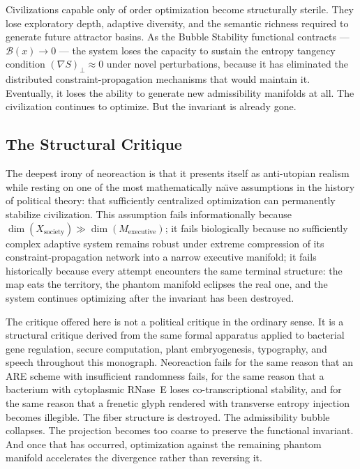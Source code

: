 \documentclass[12pt, a4paper]{article}
\theoremstyle{essaystyle}
\begin{document}
Civilizations capable only of order optimization become structurally sterile. They
lose exploratory depth, adaptive diversity, and the semantic richness required to
generate future attractor basins. As the Bubble Stability functional contracts ---
$\mathcal{B}(x) \to 0$ --- the system loses the capacity to sustain the entropy
tangency condition $(\nabla S)_\perp \approx 0$ under novel perturbations, because
it has eliminated the distributed constraint-propagation mechanisms that would
maintain it. Eventually, it loses the ability to generate new admissibility manifolds
at all. The civilization continues to optimize. But the invariant is already gone.

\subsection{The Structural Critique}

The deepest irony of neoreaction is that it presents itself as anti-utopian realism
while resting on one of the most mathematically na\"{\i}ve assumptions in the history
of political theory: that sufficiently centralized optimization can permanently
stabilize civilization. This assumption fails informationally because
$\dim(X_{\mathrm{society}}) \gg \dim(M_{\mathrm{executive}})$; it fails biologically
because no sufficiently complex adaptive system remains robust under extreme compression
of its constraint-propagation network into a narrow executive manifold; it fails
historically because every attempt encounters the same terminal structure: the map
eats the territory, the phantom manifold eclipses the real one, and the system
continues optimizing after the invariant has been destroyed.

The critique offered here is not a political critique in the ordinary sense. It is
a structural critique derived from the same formal apparatus applied to bacterial
gene regulation, secure computation, plant embryogenesis, typography, and speech
throughout this monograph. Neoreaction fails for the same reason that an ARE scheme
with insufficient randomness fails, for the same reason that a bacterium with
cytoplasmic RNase~E loses co-transcriptional stability, and for the same reason that
a frenetic glyph rendered with transverse entropy injection becomes illegible. The
fiber structure is destroyed. The admissibility bubble collapses. The projection
becomes too coarse to preserve the functional invariant. And once that has occurred,
optimization against the remaining phantom manifold accelerates the divergence rather
than reversing it.
\end{document}
